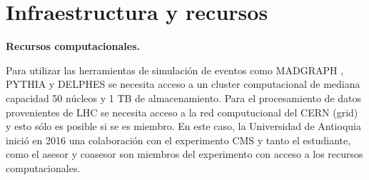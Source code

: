 \section{Infraestructura y recursos}

\textbf{Recursos computacionales.}

Para utilizar las herramientas de simulación de eventos como MADGRAPH \cite{Alwall:2014hca}, PYTHIA \cite{Sjostrand:2014zea} y DELPHES \cite{deFavereau:2013fsa} se necesita acceso a un cluster computacional de mediana capacidad	 50 núcleos y 1 TB de almacenamiento. Para el procesamiento de datos provenientes de LHC se necesita acceso a la red computucional del CERN (grid) y esto sólo es posible si se es miembro. En este caso, la Universidad de Antioquia inició en 2016 una colaboración con el experimento CMS y tanto el estudiante, como el asesor y coasesor son miembros del experimento con acceso a los recursos computacionales.

\newpage





